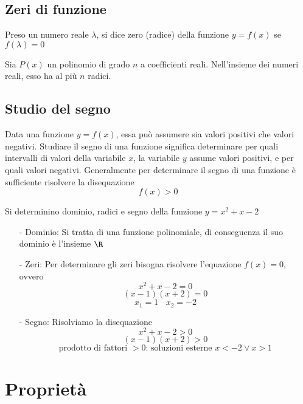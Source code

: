 \documentclass{article}     %
\begin{document}
    \subsection{Zeri di funzione}
        \begin{boxdef}
            Preso un numero reale $\lambda$, si dice zero (radice) della funzione $y=f(x)$ se $f(\lambda)=0$
        \end{boxdef}
        
        \begin{shaded}
            \begin{theorem}
                Sia $P(x)$ un polinomio di grado $n$ a coefficienti reali. Nell'insieme dei numeri reali, esso ha al più $n$ radici.
            \end{theorem}
        \end{shaded}
    \subsection{Studio del segno}
        Data una funzione $y=f(x)$, essa può assumere sia valori positivi che valori negativi. Studiare il segno di una funzione significa determinare per quali intervalli di valori della variabile $x$, la variabile $y$ assume valori positivi, e per quali valori negativi. Generalmente per determinare il segno di una funzione è sufficiente risolvere la disequazione \[f(x)>0\]
        \begin{ex}
            Si determinino dominio, radici e segno della funzione $y=x^2+x-2$
        \end{ex}
            \begin{enumerate}
                \item[-] Dominio: Si tratta di una funzione polinomiale, di conseguenza il suo dominio è l'insieme $\R$
                \item[-] Zeri: Per determinare gli zeri bisogna risolvere l'equazione $f(x)=0$, ovvero \[x^2+x-2=0\]\[(x-1)(x+2)=0\]\[x_1=1~~~~x_2=-2\]
                \item[-] Segno: Risolviamo la disequazione \[x^2+x-2>0\]\[(x-1)(x+2)>0\]\[\text{prodotto di fattori } >0 \text{: soluzioni esterne }x<-2\lor x>1\]
            \end{enumerate}
    \section{Proprietà}
\end{document}
